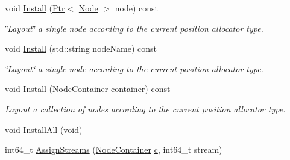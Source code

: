 \begin{DoxyCompactItemize}
void \hyperlink{classns3_1_1MobilityHelper_a07737960ee95c0777109cf2994dd97ae}{Install} (\hyperlink{classns3_1_1Ptr}{Ptr}$<$ \hyperlink{classns3_1_1Node}{Node} $>$ node) const 
\begin{DoxyCompactList}\small\item\em \char`\"{}\+Layout\char`\"{} a single node according to the current position allocator type. \end{DoxyCompactList}\item 
void \hyperlink{classns3_1_1MobilityHelper_abce9facd6356883144742a4e31bdb3e7}{Install} (std\+::string node\+Name) const 
\begin{DoxyCompactList}\small\item\em \char`\"{}\+Layout\char`\"{} a single node according to the current position allocator type. \end{DoxyCompactList}\item 
void \hyperlink{classns3_1_1MobilityHelper_af015c6c360bd7356e30e0c457aabbeb5}{Install} (\hyperlink{classns3_1_1NodeContainer}{Node\+Container} container) const 
\begin{DoxyCompactList}\small\item\em Layout a collection of nodes according to the current position allocator type. \end{DoxyCompactList}\item 
void \hyperlink{classns3_1_1MobilityHelper_a83d384e4ff6dc7ba786c0a73ca2ec899}{Install\+All} (void)
\item 
int64\+\_\+t \hyperlink{classns3_1_1MobilityHelper_a13e35a27577e5927574af6cfdec4c605}{Assign\+Streams} (\hyperlink{classns3_1_1NodeContainer}{Node\+Container} \hyperlink{mmwave_2model_2fading-traces_2fading__trace__generator_8m_ae0323a9039add2978bf5b49550572c7c}{c}, int64\+\_\+t stream)
\end{DoxyCompactItemize}
